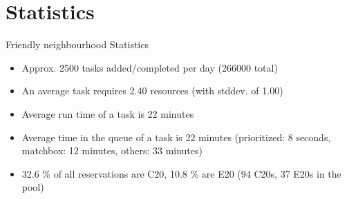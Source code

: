 \documentclass[xcolor=pdftex,dvipsnames,table]{beamer}
\begin{document}
\section{Statistics}
\begin{frame}
Friendly neighbourhood Statistics
\begin{itemize}
  \item Approx. 2500 tasks added/completed per day (266000 total)
  \item An average task requires 2.40 resources (with stddev. of 1.00)
  \item Average run time of a task is 22 minutes
  \item Average time in the queue of a task is 22 minutes (prioritized: 8 seconds, matchbox: 12 minutes, others: 33 minutes)
  \item 32.6 \% of all reservations are C20, 10.8 \% are E20 (94 C20s, 37 E20s in the pool)
\end{itemize}
\end{frame}
\end{document}
